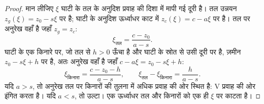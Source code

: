 \begin{proof}
मान लीजिए $\xi$ घाटी के तल के अनुदिश प्रवाह की दिशा में मापी गई दूरी है। तल उन्नयन $z_g(\xi) = z_0 - s\xi$ पर है;
घाटी के अनुदिश ऊर्ध्वाधर काट में  $z_c(\xi) = c - a\xi$ पर है। तल पर अनुरेख वहाँ है जहाँ $z_g = z_c$:
\[
  \xi_{\text{तल}} = \frac{c - z_0}{a - s}.
\]
घाटी के एक किनारे पर, जो तल से $h > 0$ ऊँचा है और घाटी के स्रोत से उसी दूरी पर है, ज़मीन $z_0 - s\xi + h$ पर है,
अतः अनुरेख वहाँ है जहाँ $c - a\xi = z_0 - s\xi + h$:
\[
  \xi_{\text{किनारा}} = \frac{c - z_0 - h}{a - s}, \qquad
  \xi_{\text{तल}} - \xi_{\text{किनारा}} = \frac{h}{a - s}.
\]
यदि $a > s$, तो अनुरेख तल पर किनारों की तुलना में अधिक प्रवाह की ओर स्थित है: V प्रवाह की ओर इंगित करता है। यदि
$a < s$, तो उल्टा। एक ऊर्ध्वाधर  तल और किनारों को एक ही $\xi$ पर काटता है।
\end{proof}

